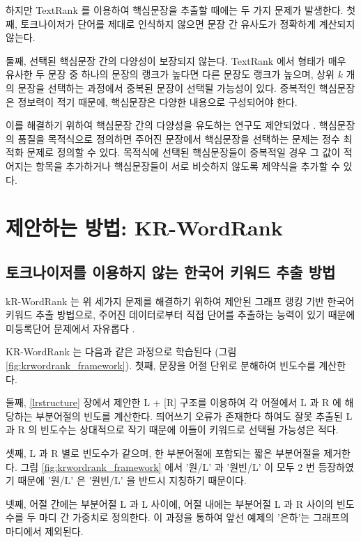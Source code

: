 \documentclass[oneside, ko,phd]{snuthesis_utf8_kor}
\begin{document}
하지만 TextRank 를 이용하여 핵심문장을 추출할 때에는 두 가지 문제가 발생한다.
첫째, 토크나이저가 단어를 제대로 인식하지 않으면 문장 간 유사도가 정확하게 계산되지 않는다.

둘째, 선택된 핵심문장 간의 다양성이 보장되지 않는다.
TextRank 에서 형태가 매우 유사한 두 문장 중 하나의 문장의 랭크가 높다면 다른 문장도 랭크가 높으며, 상위 $k$ 개의 문장을 선택하는 과정에서 중복된 문장이 선택될 가능성이 있다.
중복적인 핵심문장은 정보력이 적기 때문에, 핵심문장은 다양한 내용으로 구성되어야 한다.

이를 해결하기 위하여 핵심문장 간의 다양성을 유도하는 연구도 제안되었다 \cite{mcdonald2007study, parveen2015topical}.
핵심문장의 품질을 목적식으로 정의하면 주어진 문장에서 핵심문장을 선택하는 문제는 정수 최적화 문제로 정의할 수 있다.
목적식에 선택된 핵심문장들이 중복적일 경우 그 값이 적어지는 항목을 추가하거나 핵심문장들이 서로 비슷하지 않도록 제약식을 추가할 수 있다.


\section{제안하는 방법: KR-WordRank}

\subsection{토크나이저를 이용하지 않는 한국어 키워드 추출 방법}

kR-WordRank 는 위 세가지 문제를 해결하기 위하여 제안된 그래프 랭킹 기반 한국어 키워드 추출 방법으로, 주어진 데이터로부터 직접 단어를 추출하는 능력이 있기 때문에 미등록단어 문제에서 자유롭다 \cite{kim2014kr}.

KR-WordRank 는 다음과 같은 과정으로 학습된다 (그림 \ref{fig:krwordrank_framework}).
첫째, 문장을 어절 단위로 분해하여 빈도수를 계산한다.

둘째, \ref{lrstructure} 장에서 제안한 L + [R] 구조를 이용하여 각 어절에서 L 과 R 에 해당하는 부분어절의 빈도를 계산한다.
띄어쓰기 오류가 존재한다 하여도 잘못 추출된 L 과 R 의 빈도수는 상대적으로 작기 때문에 이들이 키워드로 선택될 가능성은 적다.

셋째, L 과 R 별로 빈도수가 같으며, 한 부분어절에 포함되는 짧은 부분어절을 제거한다.
그림 \ref{fig:krwordrank_framework} 에서 '원/L' 과 '원빈/L' 이 모두 2 번 등장하였기 때문에 '원/L' 은 '원빈/L' 을 반드시 지칭하기 때문이다.

넷째, 어절 간에는 부분어절 L 과 L 사이에, 어절 내에는 부분어절 L 과 R 사이의 빈도수를 두 마디 간 가중치로 정의한다.
이 과정을 통하여 앞선 예제의 '은하'는 그래프의 마디에서 제외된다.
\end{document}
